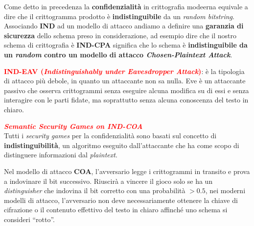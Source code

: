 \begin{flushleft}
    Come detto in precedenza la \textbf{confidenzialità} in crittografia modeerna equivale a dire che il crittogramma prodotto è \textbf{indistinguibile} da un \textit{random bitstring}. Associando \textbf{IND} ad un modello di attacco andiamo a definire una \textbf{garanzia di sicurezza} dello schema preso in considerazione, ad esempio dire che il nostro schema di crittografia è \textbf{IND-CPA} significa che lo schema è \textbf{indistinguibile da un \textit{random} contro un modello di attacco \textit{Chosen-Plaintext Attack}}.

    \smallskip

    \textcolor{red}{\textbf{IND-EAV (\textit{Indistinguishably under Eavesdropper Attack})}}: è la tipologia di attacco più debole, in quanto un attaccante non sa nulla. Eve è un attaccante passivo che osserva crittogrammi senza eseguire alcuna modifica su di essi e senza interagire con le parti fidate, ma soprattutto senza alcuna conoscenza del testo in chiaro.
\end{flushleft}

\begin{boxA}
    \textcolor{red}{\textbf{\textit{Semantic Security Games on IND-COA}}} \\
    Tutti i \textit{security games} per la confidenzialità sono basati sul concetto di \textbf{indistinguibilità}, un algoritmo eseguito dall'attaccante che ha come scopo di distinguere informazioni dal \textit{plaintext}. 
    
    \smallskip

    Nel modello di attacco \textbf{COA}, l'avversario legge i crittogrammi in transito e prova a indovinare il bit successivo. Riuscirà a vincere il gioco solo se ha un \textit{distinguisher} che indovina il bit corretto con una probabilità $ > 0.5$, nei moderni modelli di attacco, l'avversario non deve necessariamente ottenere la chiave di cifrazione o il contenuto effettivo del testo in chiaro affinché uno schema si consideri ``rotto''.
\end{boxA}

